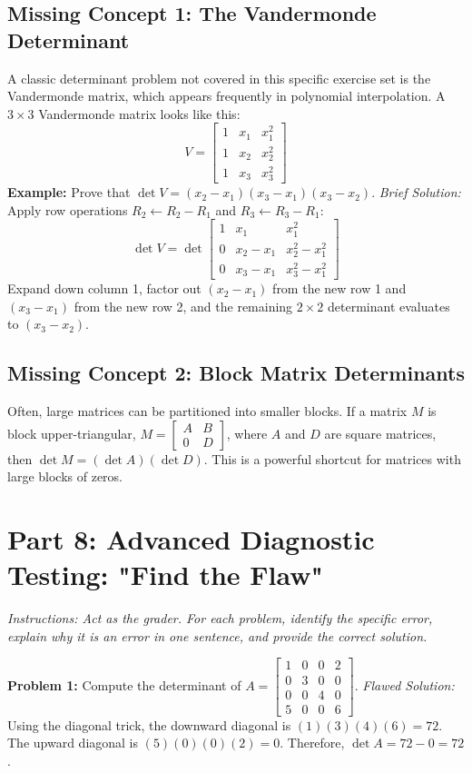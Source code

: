 \documentclass{article}
\begin{document}
\subsection{Missing Concept 1: The Vandermonde Determinant}
A classic determinant problem not covered in this specific exercise set is the Vandermonde matrix, which appears frequently in polynomial interpolation.
A $3 \times 3$ Vandermonde matrix looks like this:
\[ V = \begin{bmatrix} 1 & x_1 & x_1^2 \\ 1 & x_2 & x_2^2 \\ 1 & x_3 & x_3^2 \end{bmatrix} \]
\textbf{Example:} Prove that $\det V = (x_2 - x_1)(x_3 - x_1)(x_3 - x_2)$.
\textit{Brief Solution:} Apply row operations $R_2 \leftarrow R_2 - R_1$ and $R_3 \leftarrow R_3 - R_1$:
\[ \det V = \det \begin{bmatrix} 1 & x_1 & x_1^2 \\ 0 & x_2 - x_1 & x_2^2 - x_1^2 \\ 0 & x_3 - x_1 & x_3^2 - x_1^2 \end{bmatrix} \]
Expand down column 1, factor out $(x_2 - x_1)$ from the new row 1 and $(x_3 - x_1)$ from the new row 2, and the remaining $2 \times 2$ determinant evaluates to $(x_3 - x_2)$.

\subsection{Missing Concept 2: Block Matrix Determinants}
Often, large matrices can be partitioned into smaller blocks. If a matrix $M$ is block upper-triangular, $M = \begin{bmatrix} A & B \\ 0 & D \end{bmatrix}$, where $A$ and $D$ are square matrices, then $\det M = (\det A)(\det D)$. This is a powerful shortcut for matrices with large blocks of zeros.

\section{Part 8: Advanced Diagnostic Testing: "Find the Flaw"}

\textit{Instructions: Act as the grader. For each problem, identify the specific error, explain why it is an error in one sentence, and provide the correct solution.}

\vspace{0.3cm}
\textbf{Problem 1:} Compute the determinant of $A = \begin{bmatrix} 1 & 0 & 0 & 2 \\ 0 & 3 & 0 & 0 \\ 0 & 0 & 4 & 0 \\ 5 & 0 & 0 & 6 \end{bmatrix}$.
\newline \textit{Flawed Solution:} Using the diagonal trick, the downward diagonal is $(1)(3)(4)(6) = 72$. The upward diagonal is $(5)(0)(0)(2) = 0$. Therefore, $\det A = 72 - 0 = 72$.
\end{document}
